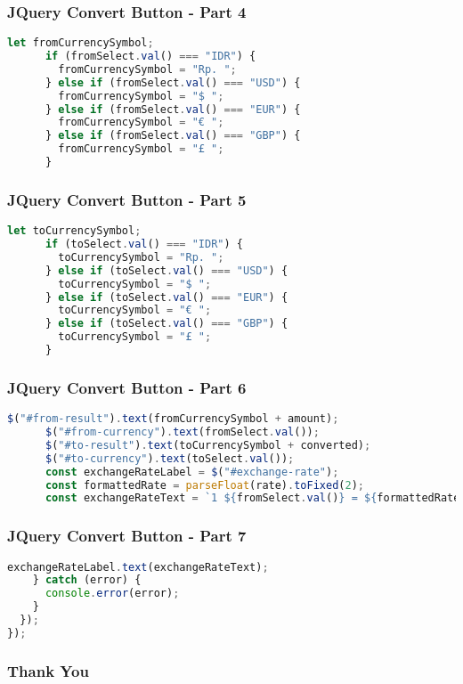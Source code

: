 \documentclass[aspectratio=169, table]{beamer}
\begin{document}
\begin{frame}[fragile]
    \frametitle{JQuery Convert Button - Part 4}
    \begin{lstlisting}[language=JavaScript]
let fromCurrencySymbol;
      if (fromSelect.val() === "IDR") {
        fromCurrencySymbol = "Rp. ";
      } else if (fromSelect.val() === "USD") {
        fromCurrencySymbol = "$ ";
      } else if (fromSelect.val() === "EUR") {
        fromCurrencySymbol = "€ ";
      } else if (fromSelect.val() === "GBP") {
        fromCurrencySymbol = "£ ";
      }
    \end{lstlisting}
\end{frame}

\begin{frame}[fragile]
    \frametitle{JQuery Convert Button - Part 5}
    \begin{lstlisting}[language=JavaScript]
let toCurrencySymbol;
      if (toSelect.val() === "IDR") {
        toCurrencySymbol = "Rp. ";
      } else if (toSelect.val() === "USD") {
        toCurrencySymbol = "$ ";
      } else if (toSelect.val() === "EUR") {
        toCurrencySymbol = "€ ";
      } else if (toSelect.val() === "GBP") {
        toCurrencySymbol = "£ ";
      }
    \end{lstlisting}
\end{frame}

\begin{frame}[fragile]
    \frametitle{JQuery Convert Button - Part 6}
    \begin{lstlisting}[language=JavaScript]
$("#from-result").text(fromCurrencySymbol + amount);
      $("#from-currency").text(fromSelect.val());
      $("#to-result").text(toCurrencySymbol + converted);
      $("#to-currency").text(toSelect.val());
      const exchangeRateLabel = $("#exchange-rate");
      const formattedRate = parseFloat(rate).toFixed(2);
      const exchangeRateText = `1 ${fromSelect.val()} = ${formattedRate} ${toSelect.val()}`;
    \end{lstlisting}
\end{frame}

\begin{frame}[fragile]
    \frametitle{JQuery Convert Button - Part 7}
    \begin{lstlisting}[language=JavaScript]
      exchangeRateLabel.text(exchangeRateText);
    } catch (error) {
      console.error(error);
    }
  });
});
    \end{lstlisting}
\end{frame}

\begin{frame4}
    \frametitle{Thank You}
\end{frame4}
\end{document}
